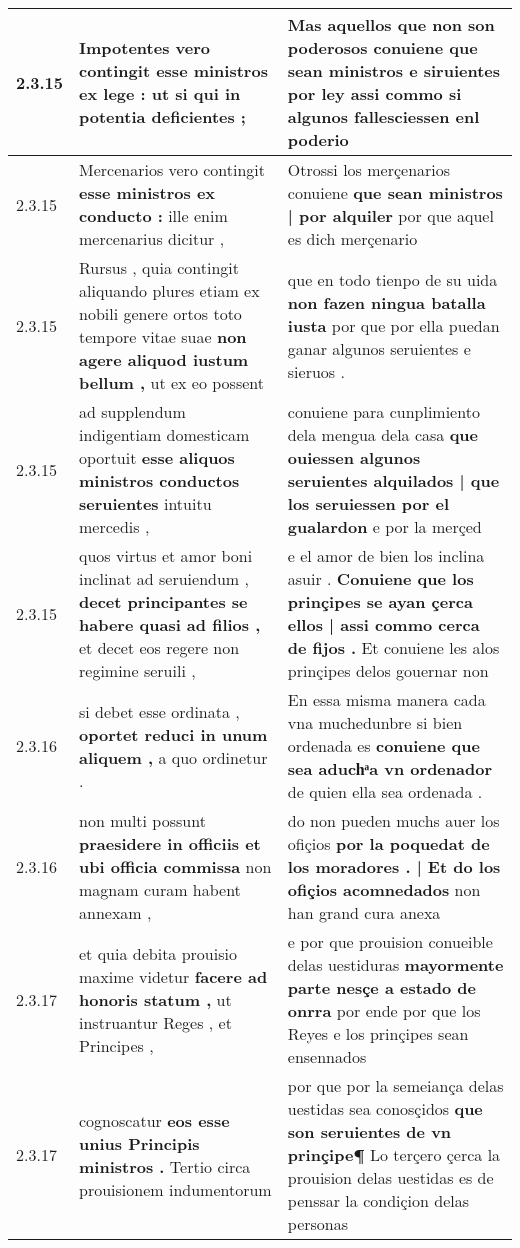 \begin{tabular}{|p{1cm}|p{6.5cm}|p{6.5cm}|}
2.3.15 & Impotentes vero contingit \textbf{ esse ministros ex lege : } ut si qui in potentia deficientes ; & Mas aquellos que non son poderosos \textbf{ conuiene que sean ministros e siruientes por ley } assi commo si algunos fallesciessen enl poderio \\\hline
2.3.15 & Mercenarios vero contingit \textbf{ esse ministros ex conducto : } ille enim mercenarius dicitur , & Otrossi los merçenarios conuiene \textbf{ que sean ministros | por alquiler } por que aquel es dich merçenario \\\hline
2.3.15 & Rursus , quia contingit aliquando plures etiam ex nobili genere ortos toto tempore vitae suae \textbf{ non agere aliquod iustum bellum , } ut ex eo possent & que en todo tienpo de su uida \textbf{ non fazen ningua batalla iusta } por que por ella puedan ganar algunos seruientes e sieruos . \\\hline
2.3.15 & ad supplendum indigentiam domesticam oportuit \textbf{ esse aliquos ministros conductos seruientes } intuitu mercedis , & conuiene para cunplimiento dela mengua dela casa \textbf{ que ouiessen algunos seruientes alquilados | que los seruiessen por el gualardon } e por la merçed \\\hline
2.3.15 & quos virtus et amor boni inclinat ad seruiendum , \textbf{ decet principantes se habere quasi ad filios , } et decet eos regere non regimine seruili , & e el amor de bien los inclina asuir . \textbf{ Conuiene que los prinçipes se ayan çerca ellos | assi commo cerca de fijos . } Et conuiene les alos prinçipes delos gouernar non \\\hline
2.3.16 & si debet esse ordinata , \textbf{ oportet reduci in unum aliquem , } a quo ordinetur . & En essa misma manera cada vna muchedunbre si bien ordenada es \textbf{ conuiene que sea aduchͣa vn ordenador } de quien ella sea ordenada . \\\hline
2.3.16 & non multi possunt \textbf{ praesidere in officiis et ubi officia commissa } non magnam curam habent annexam , & do non pueden muchs auer los ofiçios \textbf{ por la poquedat de los moradores . | Et do los ofiçios acomnedados } non han grand cura anexa \\\hline
2.3.17 & et quia debita prouisio maxime videtur \textbf{ facere ad honoris statum , } ut instruantur Reges , et Principes , & e por que prouision conueible delas uestiduras \textbf{ mayormente parte nesçe a estado de onrra } por ende por que los Reyes e los prinçipes sean ensennados \\\hline
2.3.17 & cognoscatur \textbf{ eos esse unius Principis ministros . } Tertio circa prouisionem indumentorum & por que por la semeiança delas uestidas sea conosçidos \textbf{ que son seruientes de vn prinçipe¶ } Lo terçero çerca la prouision delas uestidas es de penssar la condiçion delas personas \\\hline

\end{tabular}
